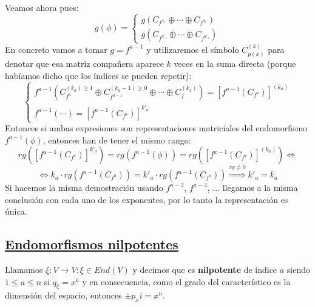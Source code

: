 \documentclass[10pt,a4paper,openright]{book}
\begin{document}
Veamos ahora pues:
$$g(\phi)=\begin{cases} g\left( C_{f^{a_1}} \oplus \cdots \oplus C_{f^{a_s}}\right) \\ g\left( C_{f^{a'_1}} \oplus \cdots \oplus C_{f^{a'_s}} \right)\end{cases}$$
En concreto vamos a tomar $g= f^{a-1}$ y utilizaremos el símbolo $C_{p(x)}^{(k)}$ para denotar que esa matriz compañera aparece $k$ veces en la suma directa (porque habíamos dicho que los índices se pueden repetir):
$$\begin{cases} f^{a-1}\left( C_{f^{a}}^{(k_a)\geq 1} \oplus C_{f^{a-1}}^{(k_a -1)\geq 0} \oplus \cdots \oplus C_{f}^{(k_1)}\right)= \left[f^{a-1}\left( C_{f^a} \right)\right]^{(k_a)} \\
f^{a-1}\left( \cdots \right) = \left[f^{a-1}\left( C_{f^a} \right)\right]^{k'_a}
\end{cases}$$
Entonces si ambas expresiones son representaciones matriciales del endomorfismo $f^{a-1}(\phi)$, entonces han de tener el mismo rango:
$$rg\left( \left[f^{a-1}\left( C_{f^a} \right)\right]^{k'_a} \right) = rg\left(f^{a-1}(\phi)\right) = rg\left( \left[f^{a-1}\left( C_{f^a} \right)\right]^{(k_a)}  \right)\Leftrightarrow $$
$$\Leftrightarrow k_a \cdot rg \left( f^{a-1}\left(C_{f^{a}}\right) \right) = k'_a \cdot rg \left( f^{a-1}\left(C_{f^{a}}\right) \right)\stackrel{rg \neq 0}{\Rightarrow} k'_a = k_a$$
Si hacemos la misma demostración usando $f^{a-2}$, $f^{a-3}$, ... llegamos a la misma conclusión con cada uno de los exponentes, por lo tanto la representación es única.

\subsection*{\underline{Endomorfismos nilpotentes}}
Llamamos $\xi: V\rightarrow V: \xi \in End(V)$ y decimos que es \textbf{nilpotente} de índice $a$ siendo $1\leq a \leq n$ si $q_\xi = x^a$ y en consecuencia, como el grado del característico es la dimensión del espacio, entonces $\pm p_xi = x^n$.
\end{document}
